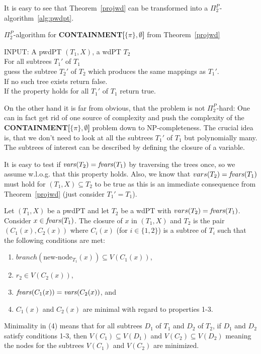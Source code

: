 It is easy to see that Theorem~\ref{projwd} can be transformed into a
$\Pi^P_2$-algorithm~\ref{alg:pwdpt}.

\begin{algorithm}
	\caption{$\Pi^P_2$-algorithm for
	\textbf{CONTAINMENT[$\{ \pi \},\emptyset$]} from Theorem~\ref{projwd}}
\label{alg:pwdpt}
INPUT: A pwdPT $(T_1,X)$, a wdPT $T_2$\\
For all subtrees $T_1'$ of $T_1$\\
guess the subtree $T_2'$ of $T_2$ which produces the same mappings as
$T_1'$. \\
If no such tree exists return false.\\
If the property holds for all $T_1'$ of $T_1$ return true.
\end{algorithm}

On the other hand it is far from obvious, 
that the problem is not $\Pi^P_2$-hard: One can in fact
get rid of one source of complexity and push the complexity of the\\
\textbf{CONTAINMENT[$\{\pi\},\emptyset$]} problem down to
NP-completeness.
The crucial idea is, that we don't need to look at all the subtrees $T_1'$ of
$T_1$ but polynomially many. The subtrees of interest can be described by
defining the closure of a variable.

It is easy to test if $\mathit{vars}(T_2) = \mathit{fvars}(T_1)$ by traversing the trees once, so
we assume w.l.o.g. that this property holds. Also, we know that $vars(T_2) =
\mathit{fvars}(T_1)$ must hold for $(T_1,X) \subseteq T_2$ to be true as this is an
immediate consequence from Theorem~\ref{projwd} (just consider $T_1' = T_1$).

\begin{definition}
	Let $(T_1,X)$ be a pwdPT and let $T_2$ be a wdPT with
	$vars(T_2) = \mathit{fvars}(T_1)$. Consider $x \in \mathit{fvars}(T_1)$. The closure
	of $x$ in $(T_1,X)$ and $T_2$ is the pair $(C_1(x),C_2(x))$ where
	$C_i(x)$ (for $i \in \{1,2\}$) is a subtree of $T_i$ such that the
	following conditions are met:
	\begin{enumerate}
		\item $branch(\mbox{new-node}_{T_1}(x)) \subseteq V(C_1(x))$,
		\item $r_2 \in V(C_2(x))$,
		\item $\mathit{fvars}(C_1(x)) = \mathit{vars}(C_2(x))$, and
		\item $C_1(x)$ and $C_2(x)$ are minimal with regard to properties 1-3.
	\end{enumerate}
	Minimality in (4) means that for all subtrees $D_1$ of $T_1$ and $D_2$ of
	$T_2$, if $D_1$ and $D_2$ satisfy conditions 1-3, then $V(C_1) \subseteq
	V(D_1)$ and $V(C_2) \subseteq V(D_2)$ meaning the nodes for the subtrees
	$V(C_1)$ and $V(C_2)$ are minimized.
\end{definition}

